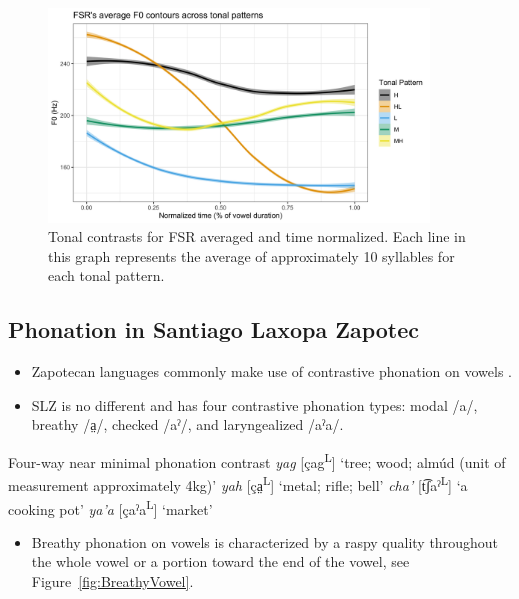 \documentclass[12pt, letterpaper]{article}
\newcommand{\supr}[1]{\textsuperscript{#1}}
\begin{document}
\begin{figure}[!ht]
	\centering
	\includegraphics[width=0.9\textwidth]{../FSRTonePlot.png}
	\caption{Tonal contrasts for FSR averaged and time normalized. Each line in this graph represents the average of approximately 10 syllables for each tonal pattern. }
	\label{fig:FSRTonePlot}
\end{figure}

\subsection{Phonation in Santiago Laxopa Zapotec} \label{sec:Phonation}

\begin{itemize}
	\item Zapotecan languages commonly make use of contrastive phonation on vowels \citep[e.g.,][]{avelinobecerraTopicsYalalagZapotec2004,longDiccionarioZapotecoSan2005,avelinoAcousticElectroglottographicAnalyses2010,lopeznicolasEstudiosFonologiaGramatica2016,chavez-peonInteractionMetricalStructure2010}.
	\item SLZ is no different and has four contrastive phonation types: modal /a/, breathy /a̤/, checked /aˀ/, and laryngealized /aˀa/. 
\end{itemize}

\ea \label{ex:YA} Four-way near minimal phonation contrast
	\ea \textit{yag}  [çag\supr{L}] `tree; wood; almúd (unit of measurement approximately 4kg)'
	\ex \textit{yah}  [ça̤\supr{L}] `metal; rifle; bell'
	\ex \textit{cha'}  [t͡ʃaˀ\supr{L}]  `a cooking pot'
	\ex \textit{ya'a}  [çaˀa\supr{L}]  `market'
	\z 
\z 
\begin{itemize}
	\item Breathy phonation on vowels is characterized by a raspy quality throughout the whole vowel or a portion toward the end of the vowel, see Figure~\ref{fig:BreathyVowel}. 
\end{itemize}
\end{document}
